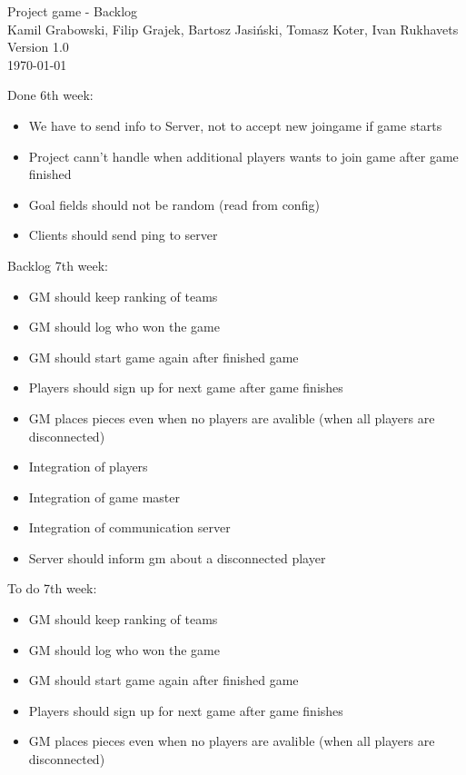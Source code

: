 \documentclass[11pt,a4paper]{article}
\begin{document}
\begin{titlepage}
\centering
\huge Project game - Backlog \\
\vspace{1.5cm}
\large Kamil Grabowski, Filip Grajek, Bartosz Jasiński, Tomasz Koter, Ivan Rukhavets \\
\vspace{1.0cm}
Version 1.0 \\
\vspace{1.0cm}
\today
\end{titlepage}

Done 6th week:
\begin{itemize}
\item We have to send info to Server, not to accept new joingame if game starts
\item Project cann't handle when additional players wants to join game after game finished
\item Goal fields should not be random (read from config)
\item Clients should send ping to server
\end{itemize}


Backlog 7th week:
\begin{itemize}
\item GM should keep ranking of teams
\item GM should log who won the game
\item GM should start game again after finished game
\item Players should sign up for next game after game finishes
\item GM places pieces even when no players are avalible (when all players are disconnected)
\item Integration of players
\item Integration of game master
\item Integration of communication server
\item Server should inform gm about a disconnected player
\end{itemize}


To do 7th week:
\begin{itemize}
\item GM should keep ranking of teams
\item GM should log who won the game
\item GM should start game again after finished game
\item Players should sign up for next game after game finishes
\item GM places pieces even when no players are avalible (when all players are disconnected)
\end{itemize}
\end{document}
